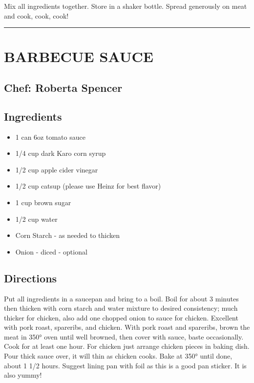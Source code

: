 \documentclass[
]{book}
\providecommand{\tightlist}{%
  \setlength{\itemsep}{0pt}\setlength{\parskip}{0pt}}
\begin{document}
Mix all ingredients together. Store in a shaker bottle. Spread generously on meat and cook, cook, cook!

\begin{center}\rule{0.5\linewidth}{0.5pt}\end{center}

\hypertarget{barbecue-sauce}{%
\section*{BARBECUE SAUCE}\label{barbecue-sauce}}


\hypertarget{chef-roberta-spencer-40}{%
\subsection*{Chef: Roberta Spencer}\label{chef-roberta-spencer-40}}


\hypertarget{ingredients-115}{%
\subsection*{Ingredients}\label{ingredients-115}}


\begin{itemize}
\tightlist
\item
  1 can 6oz tomato sauce
\item
  1/4 cup dark Karo corn syrup
\item
  1/2 cup apple cider vinegar
\item
  1/2 cup catsup (please use Heinz for best flavor)
\item
  1 cup brown sugar
\item
  1/2 cup water
\item
  Corn Starch - as needed to thicken
\item
  Onion - diced - optional
\end{itemize}

\hypertarget{directions-115}{%
\subsection*{Directions}\label{directions-115}}


Put all ingredients in a saucepan and bring to a boil. Boil for about 3 minutes then thicken with corn starch and water mixture to desired consistency; much thicker for chicken, also add one chopped onion to sauce for chicken. Excellent with pork roast, spareribs, and chicken. With pork roast and spareribs, brown the meat in 350° oven until well browned, then cover with sauce, baste occasionally. Cook for at least one hour. For chicken just arrange chicken pieces in baking dish. Pour thick sauce over, it will thin as chicken cooks. Bake at 350° until done, about 1 1/2 hours. Suggest lining pan with foil as this is a good pan sticker. It is also yummy!
\end{document}
